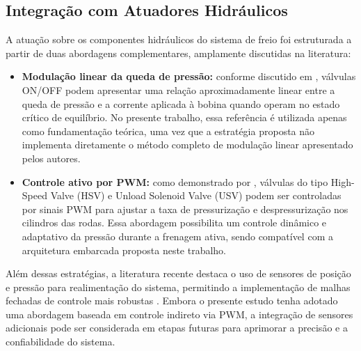 \subsection{Integração com Atuadores Hidráulicos}
\label{sec:controle-4-1-1}

A atuação sobre os componentes hidráulicos do sistema de freio foi estruturada a partir de duas abordagens complementares, amplamente discutidas na literatura:

\begin{itemize} 

    \item \textbf{Modulação linear da queda de pressão:} conforme discutido em , válvulas ON/OFF podem apresentar uma relação aproximadamente linear entre a queda de pressão e a corrente aplicada à bobina quando operam no estado crítico de equilíbrio. No presente trabalho, essa referência é utilizada apenas como fundamentação teórica, uma vez que a estratégia proposta não implementa diretamente o método completo de modulação linear apresentado pelos autores.
    \item \textbf{Controle ativo por PWM:} como demonstrado por , válvulas do tipo High-Speed Valve (HSV) e Unload Solenoid Valve (USV) podem ser controladas por sinais PWM para ajustar a taxa de pressurização e despressurização nos cilindros das rodas. Essa abordagem possibilita um controle dinâmico e adaptativo da pressão durante a frenagem ativa, sendo compatível com a arquitetura embarcada proposta neste trabalho. 
\end{itemize}

Além dessas estratégias, a literatura recente destaca o uso de sensores de posição e pressão para realimentação do sistema, permitindo a implementação de malhas fechadas de controle mais robustas \cite{HouhuaJingShihao2023}. Embora o presente estudo tenha adotado uma abordagem baseada em controle indireto via PWM, a integração de sensores adicionais pode ser considerada em etapas futuras para aprimorar a precisão e a confiabilidade do sistema.

